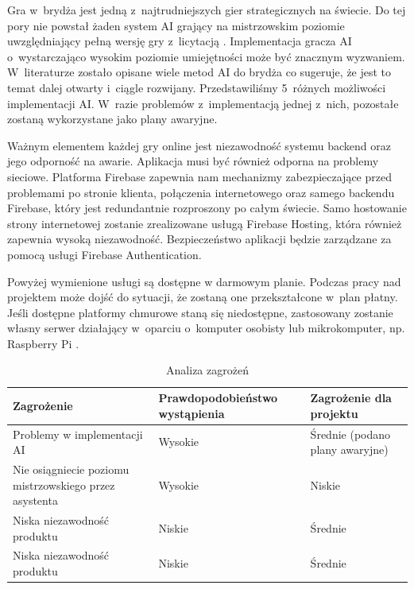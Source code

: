 Gra w~brydża jest jedną z~najtrudniejszych gier strategicznych na świecie.
Do tej pory nie powstał żaden system AI grający na mistrzowskim poziomie
uwzględniający pełną wersję gry z~licytacją \cite{Bethe2021AdvancesIC}.
Implementacja gracza AI o~wystarczająco wysokim poziomie umiejętności może
być znacznym wyzwaniem. W~literaturze zostało opisane wiele metod AI do brydża
\cite{Zhang2019DesignAD,Zhang2022TheSO,Zhang2022AIEB,Ginsberg1999GIBST}
co sugeruje, że jest to temat dalej otwarty i~ciągle rozwijany.
Przedstawiliśmy 5~różnych możliwości implementacji AI.
W~razie problemów z~implementacją jednej z~nich, pozostałe
zostaną wykorzystane jako plany awaryjne.

Ważnym elementem każdej gry online jest niezawodność systemu
backend oraz jego odporność na awarie.
Aplikacja musi być również odporna na problemy sieciowe.
Platforma Firebase zapewnia nam mechanizmy zabezpieczające
przed problemami po stronie klienta, połączenia internetowego
oraz samego backendu Firebase, który jest redundantnie
rozproszony po całym świecie.
Samo hostowanie strony internetowej zostanie zrealizowane
usługą Firebase Hosting, która również zapewnia wysoką
niezawodność.
Bezpieczeństwo aplikacji będzie zarządzane za pomocą
usługi Firebase Authentication.

Powyżej wymienione usługi są dostępne w darmowym planie.
Podczas pracy nad projektem może dojść do sytuacji, że
zostaną one przekształcone w~plan płatny.
Jeśli dostępne platformy chmurowe staną się niedostępne,
zastosowany zostanie własny serwer działający
w~oparciu o~komputer osobisty lub mikrokomputer, np. Raspberry Pi \cite{RPi}.

\begin{table}[h]
  \centering
  \begin{tabularx}{\textwidth}{|p{5.5cm}|Y|Y|}
    \hline
    \textbf{Zagrożenie}                                    & \textbf{Prawdopodobieństwo wystąpienia} & \textbf{Zagrożenie dla projektu} \tabularnewline[0.2cm]
    \hline
    Problemy w implementacji AI                            & Wysokie                                 & Średnie (podano plany awaryjne)  \tabularnewline[0.2cm]
    Nie osiągniecie poziomu mistrzowskiego przez asystenta & Wysokie                                 & Niskie                           \tabularnewline[0.3cm]
    Niska niezawodność produktu                            & Niskie                                  & Średnie                          \tabularnewline[0.1cm]
    Niska niezawodność produktu                            & Niskie                                  & Średnie                          \tabularnewline[0.1cm]
    \hline
  \end{tabularx}
  \caption{Analiza zagrożeń}
  \label{tab:zagrozenia}
\end{table}

